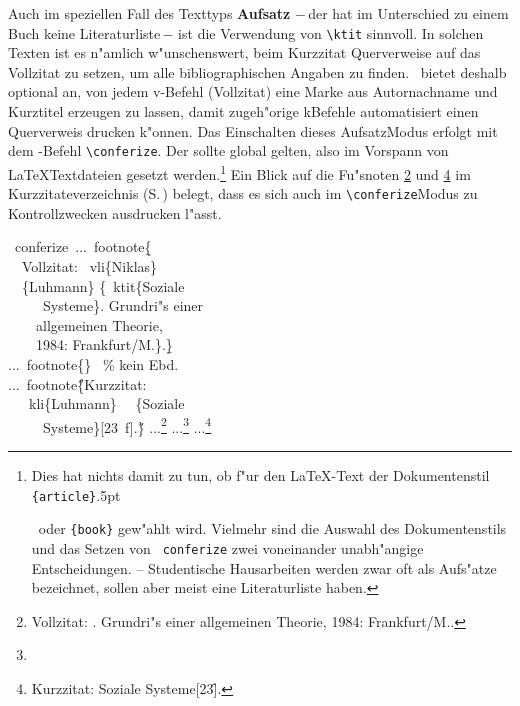 \documentclass[12pt,a4paper]{article}
\newcommand{\pdfko}[1]{\kern #1pt
                          \strut\ignorespaces}%
\newcommand{\pbs}{\string\ \unskip}
\newcommand{\bs}{\protect\pbs}
\begin{document}
Auch im speziellen Fall des Texttyps \textbf{Aufsatz} $-$\,der hat im Unterschied
zu einem Buch keine Literaturliste\,$-$ ist die Verwendung von \verb|\ktit|
sinnvoll. In solchen Texten ist es n"amlich w"unschenswert, beim Kurzzitat
Querverweise auf das Vollzitat zu setzen, um alle bibliographischen Angaben zu
finden. \BibArts\ bietet deshalb optional an, von jedem v-Befehl
(Vollzitat) eine Marke aus Autornachname und Kurztitel erzeugen zu lassen,
damit zugeh"orige k\fhy Befehle automatisiert einen Querverweis drucken k"onnen. 
Das Einschalten dieses Aufsatz\hy Modus erfolgt mit dem \BibArts-Befehl
\verb|\conferize|. Der sollte global gelten, also im Vorspann von
\LaTeX\hy Textdateien gesetzt werden.\footnote{Dies hat nichts
damit zu tun, ob f"ur den \LaTeX-Text der Dokumentenstil \texttt{\{article\}}\pdfko{.5}\ 
oder \texttt{\{book\}} gew"ahlt wird. Vielmehr sind die Auswahl des 
Dokumentenstils und das Setzen von \texttt{\bs conferize} zwei voneinander 
unabh"angige Entscheidungen. -- Studentische Hausarbeiten werden zwar oft
als Aufs"atze bezeichnet, sollen aber meist eine Literaturliste haben.} 
Ein Blick auf die Fu"snoten \ref{vz} und \ref{fz} 
im Kurzzitateverzeichnis (S.\,\pageref{vkc}) belegt, dass es sich auch im
\verb|\conferize|\hy Modus zu Kontrollzwecken ausdrucken l"asst.

\Doppelbox
{\bs conferize\ ...\bs footnote\b{\{}
   \\ \ \ Vollzitat: \bs vli\{Niklas\} 
   \\ \ \ \{Luhmann\} \{\bs ktit\{Soziale 
   \\ \ \ \ \ \ Systeme\}. Grundri"s einer 
   \\ \ \ \ \ allgemeinen Theorie, 
   \\ \ \ \ \ 1984: Frankfurt/M.\}.\b{\}} 
   \\[.5ex] ...\bs footnote\{\} \ \% kein Ebd.
   \\[.5ex] ...\bs footnote\H{\{}Kurzzitat: 
   \\ \ \ \bs kli\{Luhmann\} \ \ \{Soziale 
   \\ \ \ \ \ \ Systeme\}[23\bs f].\H{\}}
}
{\conferize ...\footnote{\label{vz}%
                  Vollzitat:  {. 
     Grundri"s einer allgemeinen Theorie, 1984: Frankfurt/M.}.} 
  ...\footnote{}
  ...\footnote{\label{fz}Kurzzitat:  {Soziale Systeme}[23\f].}
}
\end{document}
